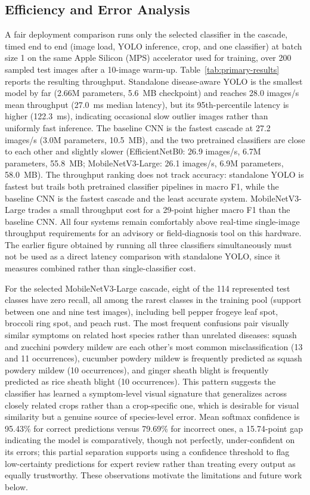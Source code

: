 \documentclass[conference]{IEEEtran}
\begin{document}
\subsection{Efficiency and Error Analysis}

A fair deployment comparison runs only the selected classifier in the cascade, timed end to end
(image load, YOLO inference, crop, and one classifier) at batch size 1 on the same Apple Silicon
(MPS) accelerator used for training, over 200 sampled test images after a 10-image warm-up.
Table~\ref{tab:primary-results} reports the resulting throughput. Standalone disease-aware YOLO is
the smallest model by far (2.66M parameters, 5.6~MB checkpoint) and reaches 28.0 images/s mean
throughput (27.0~ms median latency), but its 95th-percentile latency is higher (122.3~ms),
indicating occasional slow outlier images rather than uniformly fast inference. The baseline CNN
is the fastest cascade at 27.2 images/s (3.0M parameters, 10.5~MB), and
the two pretrained classifiers are close to each other and slightly slower (EfficientNetB0: 26.9
images/s, 6.7M parameters, 55.8~MB; MobileNetV3-Large: 26.1 images/s, 6.9M parameters, 58.0~MB).
The throughput ranking does not track accuracy: standalone YOLO is fastest but trails both
pretrained classifier pipelines in macro F1, while the baseline CNN is the fastest cascade and the
least accurate system. MobileNetV3-Large trades a small throughput cost for a 29-point higher macro
F1 than the baseline CNN. All four systems remain comfortably above real-time single-image
throughput requirements for an advisory or field-diagnosis tool on this hardware. The earlier
figure obtained by running all three classifiers simultaneously must not be used as a direct
latency comparison with standalone YOLO, since it measures combined rather than single-classifier
cost.

For the selected MobileNetV3-Large cascade, eight of the 114 represented test classes have zero
recall, all among the rarest classes in the training pool (support between one and nine test
images), including bell pepper frogeye leaf spot, broccoli ring spot, and peach rust. The most
frequent confusions pair visually similar symptoms on related host species rather than unrelated
diseases: squash and zucchini powdery mildew are each other's most common misclassification (13
and 11 occurrences), cucumber powdery mildew is frequently predicted as squash powdery mildew (10
occurrences), and ginger sheath blight is frequently predicted as rice sheath blight (10
occurrences). This pattern suggests the classifier has learned a symptom-level visual signature
that generalizes across closely related crops rather than a crop-specific one, which is desirable
for visual similarity but a genuine source of species-level error. Mean softmax confidence is
95.43\% for correct predictions versus 79.69\% for incorrect ones, a 15.74-point gap indicating the
model is comparatively, though not perfectly, under-confident on its errors; this partial
separation supports using a confidence threshold to flag low-certainty predictions for expert
review rather than treating every output as equally trustworthy. These observations motivate the
limitations and future work below.
\end{document}
